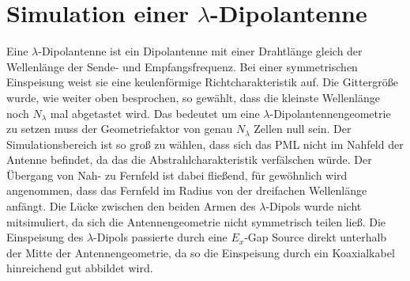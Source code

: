 \documentclass[11pt, ngerman]{article}
\begin{document}
\section{Simulation einer \(\lambda\)-Dipolantenne}
Eine \(\lambda\)-Dipolantenne ist ein Dipolantenne mit einer Drahtl\"ange gleich
der Wellenl\"ange der Sende- und Empfangsfrequenz.
Bei einer symmetrischen Einspeisung weist sie eine keulenf\"ormige Richtcharakteristik
auf.
Die Gittergr\"o{\ss}e wurde, wie weiter oben besprochen, so gew\"ahlt, dass die kleinste
Wellenl\"ange noch \(N_\lambda\) mal abgetastet wird. Das bedeutet um eine \(\lambda\)-Dipolantennengeometrie
zu setzen muss der Geometriefaktor von genau \(N_\lambda\) Zellen null sein. Der Simulationsbereich
ist so gro{\ss} zu w\"ahlen, dass sich das PML nicht im Nahfeld der Antenne befindet, da das die
Abstrahlcharakteristik verf\"alschen w\"urde. Der \"Ubergang von Nah- zu
Fernfeld ist dabei flie{\ss}end, f\"ur gew\"ohnlich wird angenommen, dass das Fernfeld im Radius von der dreifachen
Wellenl\"ange anf\"angt.
Die L\"ucke zwischen den beiden Armen des \(\lambda\)-Dipols
wurde nicht mitsimuliert, da sich die Antennengeometrie nicht symmetrisch teilen lie{\ss}.
Die Einspeisung des \(\lambda\)-Dipols passierte durch eine \(E_x\)-Gap Source direkt unterhalb der Mitte der
Antennengeometrie, da so die Einspeisung durch ein Koaxialkabel hinreichend gut abbildet wird.
\end{document}
